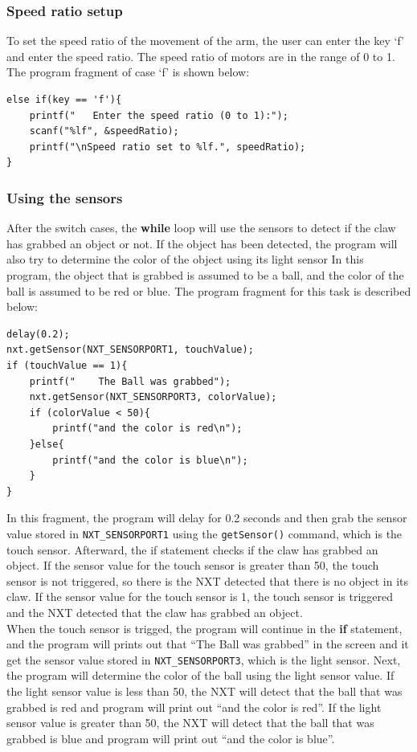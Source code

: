 \documentclass[11pt]{article}
\begin{document}
\subsubsection*{Speed ratio setup}
To set the speed ratio of the movement of the arm, the user can enter the key 
`f' and enter the speed ratio. The speed ratio of motors are in the range of 0 
to 1. The program fragment of case `f' is shown below:
\begin{lstlisting}
else if(key == 'f'){
    printf("   Enter the speed ratio (0 to 1):");
    scanf("%lf", &speedRatio);
    printf("\nSpeed ratio set to %lf.", speedRatio);
}
\end{lstlisting}

\subsubsection*{Using the sensors}
After the switch cases, the {\bf while} loop will use the sensors to detect if 
the claw has grabbed an object or not. If the object has been detected, the 
program will also try to determine the color of the object using its light sensor 
In this program, the object that is grabbed is assumed to be a ball, and the 
color of the ball is assumed to be red or blue. The program fragment for this 
task is described below:
\begin{lstlisting}
delay(0.2);
nxt.getSensor(NXT_SENSORPORT1, touchValue);
if (touchValue == 1){
    printf("    The Ball was grabbed");
    nxt.getSensor(NXT_SENSORPORT3, colorValue);
    if (colorValue < 50){
        printf("and the color is red\n");
    }else{
        printf("and the color is blue\n");
    }
}
\end{lstlisting}
In this fragment, the program will delay for 0.2 seconds and then grab the sensor 
value stored in {\tt NXT\_SENSORPORT1} using the {\tt getSensor()} command, which 
is the touch sensor. Afterward, the if statement checks if the claw has grabbed an 
object. If the sensor value for the touch sensor is greater than 50, the touch 
sensor is not triggered, so there is the NXT detected that there is no object in 
its claw. If the sensor value for the touch sensor is 1, the touch sensor is 
triggered and the NXT detected that the claw has grabbed an object. \\

When the touch sensor is trigged, the program will continue in the {\bf if} statement, 
and the program will prints out that ``The Ball was grabbed'' in the screen and it get 
the sensor value stored in {\tt NXT\_SENSORPORT3}, which is the light sensor. Next, the 
program will determine the color of the ball using the light sensor value. If the light 
sensor value is less than 50, the NXT will detect that the ball that was grabbed is 
red and program will print out ``and the color is red''. If the light sensor value is 
greater than 50, the NXT will detect that the ball that was grabbed is blue and program 
will print out ``and the color is blue''. \\
\end{document}
